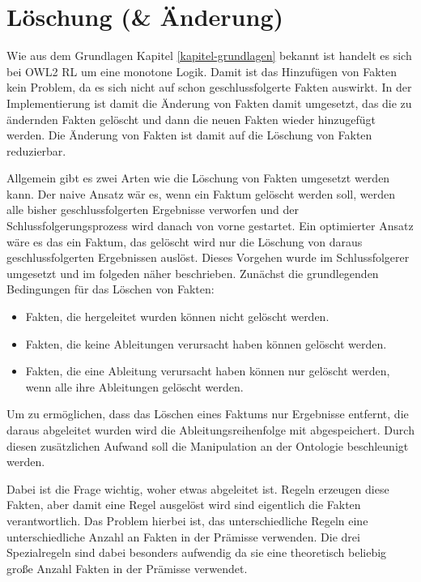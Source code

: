 \section{Löschung (\& Änderung)}

Wie aus dem Grundlagen Kapitel \ref{kapitel-grundlagen} bekannt ist handelt es sich bei OWL2 RL um eine monotone Logik. Damit ist das Hinzufügen von Fakten kein Problem, da es sich nicht auf schon geschlussfolgerte Fakten auswirkt. In der Implementierung ist damit die Änderung von Fakten damit umgesetzt, das die zu ändernden Fakten gelöscht und dann die neuen Fakten wieder hinzugefügt werden. Die Änderung von Fakten ist damit auf die Löschung von Fakten reduzierbar.

Allgemein gibt es zwei Arten wie die Löschung von Fakten umgesetzt werden kann. Der naive Ansatz wär es, wenn ein Faktum gelöscht werden soll, werden alle bisher geschlussfolgerten Ergebnisse verworfen und der Schlussfolgerungsprozess wird danach von vorne gestartet. Ein optimierter Ansatz wäre es das ein Faktum, das gelöscht wird nur die Löschung von daraus geschlussfolgerten Ergebnissen auslöst. Dieses Vorgehen wurde im Schlussfolgerer umgesetzt und im folgeden näher beschrieben. Zunächst die grundlegenden Bedingungen für das Löschen von Fakten:

\begin{itemize}
  \item Fakten, die hergeleitet wurden können nicht gelöscht werden.
  \item Fakten, die keine Ableitungen verursacht haben können gelöscht werden.
  \item Fakten, die eine Ableitung verursacht haben können nur gelöscht werden, wenn alle ihre Ableitungen gelöscht werden.
\end{itemize}

Um zu ermöglichen, dass das Löschen eines Faktums nur Ergebnisse entfernt, die daraus abgeleitet wurden wird die Ableitungsreihenfolge mit abgespeichert. Durch diesen zusätzlichen Aufwand soll die Manipulation an der Ontologie beschleunigt werden.

Dabei ist die Frage wichtig, woher etwas abgeleitet ist. Regeln erzeugen diese Fakten, aber damit eine Regel ausgelöst wird sind eigentlich die Fakten verantwortlich. Das Problem hierbei ist, das unterschiedliche Regeln eine unterschiedliche Anzahl an Fakten in der Prämisse verwenden. Die drei Spezialregeln sind dabei besonders aufwendig da sie eine theoretisch beliebig große Anzahl Fakten in der Prämisse verwendet.

